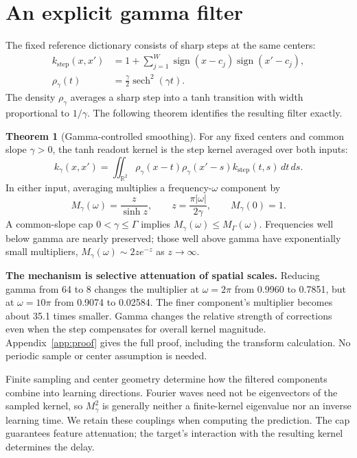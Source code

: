 \documentclass[11pt]{article}
\DeclareMathOperator{\sech}{sech}
\DeclareMathOperator{\sign}{sign}
\theoremstyle{definition}
\newtheorem{theorem}{Theorem}
\begin{document}
\section{An explicit gamma filter}
The fixed reference dictionary consists of sharp steps at the same centers:
\begin{equation}\label{eq:reference}
\begin{split}
 k_{\mathrm{step}}(x,x')&=1+\sum_{j=1}^W\sign(x-c_j)\sign(x'-c_j),\\
 \rho_\gamma(t)&=\frac{\gamma}{2}\sech^2(\gamma t).
\end{split}
\end{equation}
The density $\rho_\gamma$ averages a sharp step into a tanh transition with
width proportional to $1/\gamma$. The following theorem identifies the
resulting filter exactly.

\clearpage
\begin{theorem}[Gamma-controlled smoothing]\label{thm:mechanism}
For any fixed centers and common slope $\gamma>0$, the tanh readout kernel is
the step kernel averaged over both inputs:
\begin{equation}\label{eq:smoothing}
 k_\gamma(x,x')=\iint_{\mathbb R^2}\rho_\gamma(x-t)\rho_\gamma(x'-s)
 k_{\mathrm{step}}(t,s)\,dt\,ds.
\end{equation}
In either input, averaging multiplies a frequency-$\omega$ component by
\begin{equation}\label{eq:multiplier}
 \boxed{M_\gamma(\omega)=\frac{z}{\sinh z},\qquad
 z=\frac{\pi|\omega|}{2\gamma},\qquad M_\gamma(0)=1.}
\end{equation}
A common-slope cap $0<\gamma\le\Gamma$ implies
$M_\gamma(\omega)\le M_\Gamma(\omega)$. Frequencies well below gamma
are nearly preserved; those well above gamma have exponentially small
multipliers, $M_\gamma(\omega)\sim2ze^{-z}$ as $z\to\infty$.
\end{theorem}

\textbf{The mechanism is selective attenuation of spatial scales.}
Reducing gamma from 64 to 8 changes the multiplier at $\omega=2\pi$ from
0.9960 to 0.7851, but at $\omega=10\pi$ from 0.9074 to 0.02584. The finer
component's multiplier becomes about 35.1 times smaller. Gamma changes the
relative strength of corrections even when the step compensates for overall
kernel magnitude. Appendix~\ref{app:proof} gives the full proof, including
the transform calculation. No periodic sample or center assumption is needed.

Finite sampling and center geometry determine how the filtered components
combine into learning directions. Fourier waves need not be eigenvectors of
the sampled kernel, so $M_\gamma^2$ is generally neither a finite-kernel
eigenvalue nor an inverse learning time. We retain these couplings when
computing the prediction. The cap guarantees feature attenuation; the target's
interaction with the resulting kernel determines the delay.
\end{document}
